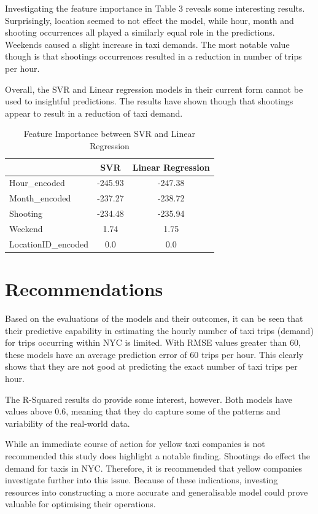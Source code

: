 \documentclass[11pt]{article}
\begin{document}
Investigating the feature importance in Table 3 reveals some interesting results. Surprisingly, location seemed to not effect the model, while hour, month and shooting occurrences all played a similarly equal role in the predictions. Weekends caused a slight increase in taxi demands. The most notable value though is that shootings occurrences resulted in a reduction in number of trips per hour. 

 Overall, the SVR and Linear regression models in their current form cannot be used to insightful predictions. The results have shown though that shootings appear to result in a reduction of taxi demand. 

\begin{table}[htbp]
    \centering
    \begin{tabular}{lcc}
        \hline
        & SVR & Linear Regression \\
        \hline
        Hour\_encoded & -245.93 & -247.38 \\
        Month\_encoded & -237.27 & -238.72 \\
        Shooting & -234.48 & -235.94 \\
        Weekend & 1.74 & 1.75 \\
        LocationID\_encoded & 0.0 & 0.0 \\
        \hline
    \end{tabular}
    \caption{Feature Importance between SVR and Linear Regression}
    \label{tab:coefficients_comparison}
\end{table}

\section{Recommendations}
\hspace{0pt}Based on the evaluations of the models and their outcomes, it can be seen that their predictive capability  in estimating the hourly number of taxi trips (demand) for trips occurring within NYC is limited. With RMSE values greater than 60, these models have an average prediction error of 60 trips per hour. This clearly shows that they are not good at predicting the exact number of taxi trips per hour.

The R-Squared results do provide some interest, however. Both models have values above 0.6, meaning that they do capture some of the patterns and variability of the real-world data.

While an immediate course of action for yellow taxi companies is not recommended this study does highlight a notable finding. Shootings do effect the demand for taxis in NYC. Therefore, it is recommended that yellow companies investigate further into this issue. Because of these indications, investing resources into constructing a more accurate and generalisable model could prove valuable for optimising their operations.
\end{document}
